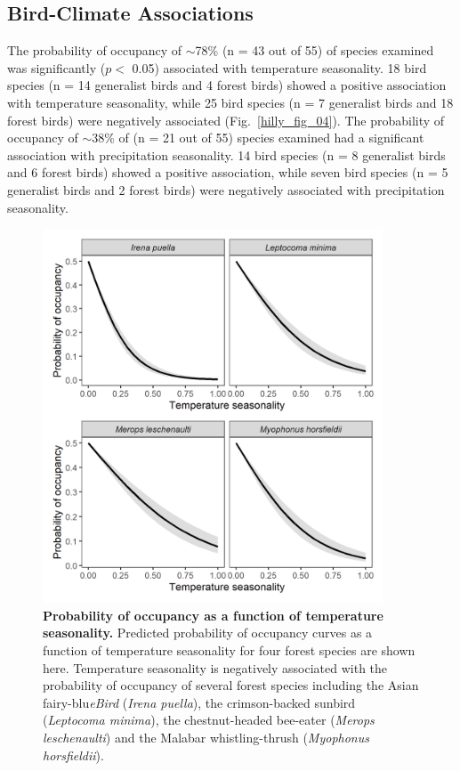 \subsection*{Bird-Climate Associations}

The probability of occupancy of $\sim$78\% (n = 43 out of 55) of species examined was significantly ($p <$ 0.05) associated with temperature seasonality.
18 bird species (n = 14 generalist birds and 4 forest birds) showed a positive association with temperature seasonality, while 25 bird species (n = 7 generalist birds and 18 forest birds) were negatively associated (Fig.~\ref{hilly_fig_04}).
The probability of occupancy of $\sim$38\% of (n = 21 out of 55) species examined had a significant association with precipitation seasonality.
14 bird species (n = 8 generalist birds and 6 forest birds) showed a positive association, while seven bird species (n = 5 generalist birds and 2 forest birds) were negatively associated with precipitation seasonality.

\begin{figure}[h!]
    \centering
    \includegraphics[width=0.9\textwidth]{figures/hillybirds/fig_05.png}
    \caption{
        \textbf{Probability of occupancy as a function of temperature seasonality.}
        Predicted probability of occupancy curves as a function of temperature seasonality for four forest species are shown here. 
        Temperature seasonality is negatively associated with the probability of occupancy of several forest species including the Asian fairy-blu\textit{eBird} (\textit{Irena puella}), the crimson-backed sunbird (\textit{Leptocoma minima}), the chestnut-headed bee-eater (\textit{Merops leschenaulti}) and the Malabar whistling-thrush (\textit{Myophonus horsfieldii}).
    }
    \label{hilly_fig_05}
\end{figure}

